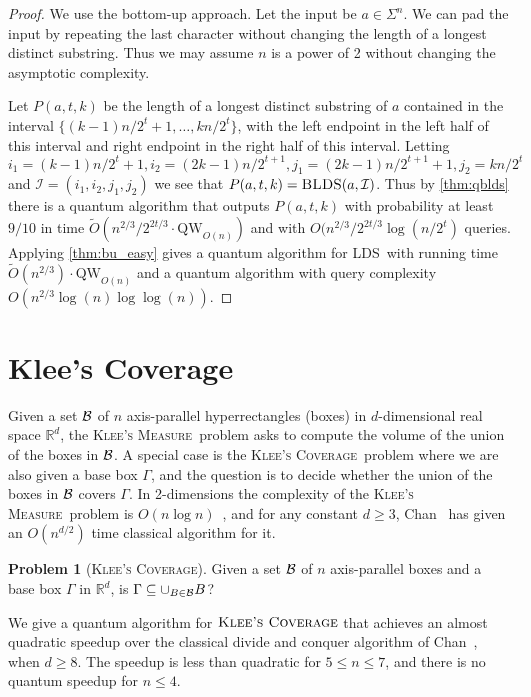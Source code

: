 \documentclass[12pt]{article}
\newcommand{\qw}{\mathrm{QW}}
\newcommand{\R}{\mathbb{R}}
\newcommand{\Iset}{\mathcal{I}}
\newcommand{\blds}{\textsc{BLDS}}
\newcommand{\lds}{\textsc{LDS}}
\newcommand{\KCf}{\textsc{Klee's Coverage}}
\newcommand{\KMf}{\textsc{Klee's Measure}}
\theoremstyle{definition}
\newtheorem{problem}[theorem]{Problem}
\begin{document}
\begin{proof}
We use the bottom-up approach.  Let the input be $a \in \Sigma^n$.  We can pad the input by repeating the last character without changing the length of a longest distinct substring.  Thus we may assume $n$ is a power of 2 without changing the asymptotic complexity.

Let $P(a, t, k)$ be the length of a longest distinct substring of $a$ contained in the interval $\{(k-1)n/2^t+1, \ldots , kn/2^t\}$, with the left endpoint in the left half of this interval and right endpoint in the right half of this interval.
Letting $i_1 = (k-1)n/2^t + 1, i_2 = (2k-1)n/2^{t+1}, j_1 = (2k-1)n/2^{t+1}+1, j_2 = kn/2^t$ and $\Iset = (i_1, i_2, j_1, j_2)$ we see that $P(a, t, k) = \blds(a, \Iset)$. 
Thus by \cref{thm:qblds} there is a quantum algorithm that outputs $P(a, t, k)$ with probability at least $9/10$ in time $\widetilde O(n^{2/3}/2^{2t/3} \cdot \qw_{O(n)})$ and with $O(n^{2/3}/2^{2t/3} \log(n/2^t)$ queries.   
Applying \cref{thm:bu_easy} gives a quantum algorithm for \lds\ with running time $\widetilde O(n^{2/3}) \cdot \qw_{O(n)}$ and a quantum algorithm with query complexity $O(n^{2/3} \log(n) \log \log(n))$.
\end{proof}

\section{Klee's Coverage}
\label{sec:klee}

Given a set $\cal B$ of $n$ axis-parallel hyperrectangles (boxes) in $d$-dimensional real space $\R^d$, the \KMf \ problem asks to compute the volume of the union of the boxes in $\cal B$. A special case is the \KCf \ problem where we are also given a base box $\Gamma$, and the question is to decide whether the union of the boxes in $\cal B$ covers $\Gamma$. 
In 2-dimensions the complexity of the \KMf \  problem is $O(n \log n)$~\cite{Klee77}, and for any constant $d \geq 3$,
Chan~\cite{Chan13} has given an $O(n^{d/2})$ time classical algorithm for it.


\begin{problem}[\KCf ]
Given a set $\cal B$ of $n$ axis-parallel boxes and a base box $\Gamma$ in $\R^d$, is $\Gamma \subseteq \cup_{B \in {\cal B}} B$?
\end{problem}

We give a quantum algorithm for $\KCf$ that achieves an almost quadratic speedup over the classical divide and conquer algorithm of Chan~\cite{Chan13}, when $d \geq 8$.
The speedup is less than quadratic for $5 \leq n \leq 7$, and there is no quantum speedup for $n \leq 4$.
\end{document}
